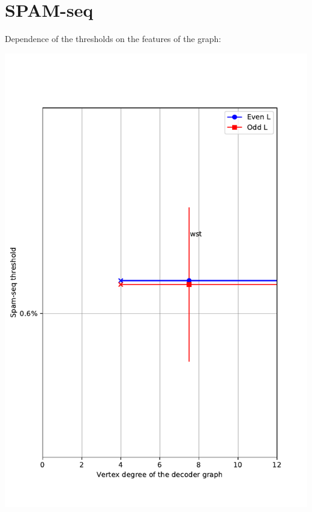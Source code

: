 \documentclass[pra]{revtex4-1}
\begin{document}
\section*{SPAM-seq}
\begin{center}
\noindent Dependence of the thresholds on the features of the graph: 
  
\includegraphics[width=.8\textwidth]{../graphs-paper2/thresholds-SPAM-seq-decoder.pdf}


\end{center}
\end{document}
